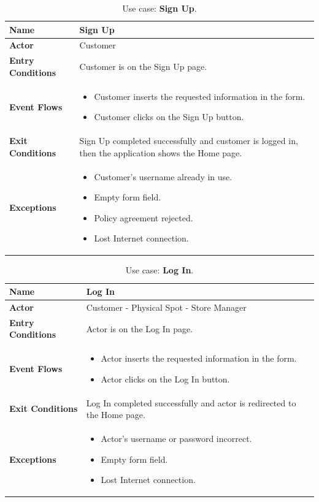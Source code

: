 \begin{table}[H]
\centering
\begin{tabular}{| m{} | m{} |} 
	\hline
	\textbf{Name} & Sign Up \\ 
	\hline
	\textbf{Actor} & Customer \\ 
	\hline
	\textbf{Entry Conditions} & Customer is on the Sign Up page. \\ 
	\hline
	\textbf{Event Flows} &
	\begin{itemize}
		\item Customer inserts the requested information in the form.
		\item Customer clicks on the Sign Up button.
	\end{itemize} \\ 
	\hline
	\textbf{Exit Conditions} & Sign Up completed successfully and customer is logged in, then the application shows the Home page. \\ 
	\hline
	\textbf{Exceptions} &
	\begin{itemize}
		\item Customer's username already in use.
		\item Empty form field.
		\item Policy agreement rejected.
		\item Lost Internet connection.
	\end{itemize} \\ 
	\hline
\end{tabular}
\caption{Use case: \textbf{Sign Up}.}
\label{tableSignUp}
\end{table}

\begin{table}[H]
\centering
\begin{tabular}{| m{} | m{} |} 
	\hline
	\textbf{Name} & Log In \\ 
	\hline
	\textbf{Actor} & Customer - Physical Spot - Store Manager \\ 
	\hline
	\textbf{Entry Conditions} & Actor is on the Log In page. \\ 
	\hline
	\textbf{Event Flows} &
	\begin{itemize}
	\item Actor inserts the requested information in the form.
	\item Actor clicks on the Log In button.
	\end{itemize} \\ 
	\hline
	\textbf{Exit Conditions} & Log In completed successfully and actor is redirected to the Home page. \\ 
	\hline
	\textbf{Exceptions} &
	\begin{itemize}
	\item Actor's username or password incorrect.
	\item Empty form field.
	\item Lost Internet connection.
	\end{itemize} \\ 
	\hline
\end{tabular}
\caption{Use case: \textbf{Log In}.}
\label{tableLogIn}
\end{table}

